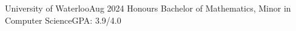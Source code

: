 \resumeSubheading
  {University of Waterloo}{Aug 2024}
  {Honours Bachelor of Mathematics, Minor in Computer Science}{GPA: 3.9/4.0}